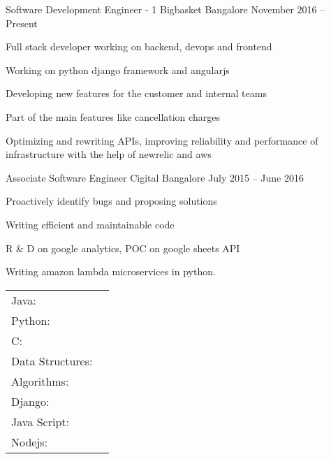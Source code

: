 \documentclass[]{awesome-cv}
\begin{document}
\vspace{-3mm}
\begin{cventries}
	\cventry
	{Software Development Engineer - 1}
	{Bigbasket}
	{Bangalore}
	{November 2016 – Present}
	{\begin{cvitems}
		\item {Full stack developer working on backend, devops and frontend}
		\item {Working on python django framework and angularjs}
		\item {Developing new features for the customer and internal teams}
		\item {Part of the main features like cancellation charges}
		\item {Optimizing and rewriting APIs, improving reliability and performance of infrastructure with the help of newrelic and aws}
		\end{cvitems}}
	\cventry
	{Associate Software Engineer}
	{Cigital}
	{Bangalore}
	{July 2015 – June 2016}
	{\begin{cvitems}
		\item {Proactively identify bugs and proposing solutions}
		\item {Writing efficient and maintainable code}
		\item {R \& D on google analytics, POC on google sheets API}
		\item {Writing amazon lambda microservices in python.}
		\end{cvitems}}
\end{cventries}
\vspace{-5mm}
\begin{cventries}
	\cventry
	{}
	{\def\arraystretch{1.15}{\begin{tabular}{ l l }
		Java:  & {\skill{ My favourite programming language}} \\
		Python:  & {\skill{ From where I started learning programming}} \\
		C:  & {\skill{ My first statically typed programming language}} \\
		Data Structures:  & {\skill{ My first love}} \\
		Algorithms:  & {\skill{ With whom I spent most of my time}} \\
		Django:  & {\skill{ My first back-end framework}} \\
		Java Script:  & {\skill{ My first front-end scripting language}} \\
		Nodejs: & {\skill{ Currently learning and exploring in depth}} \\
		\end{tabular}}}
	{}
	{}
	{}
\end{cventries}
\end{document}

